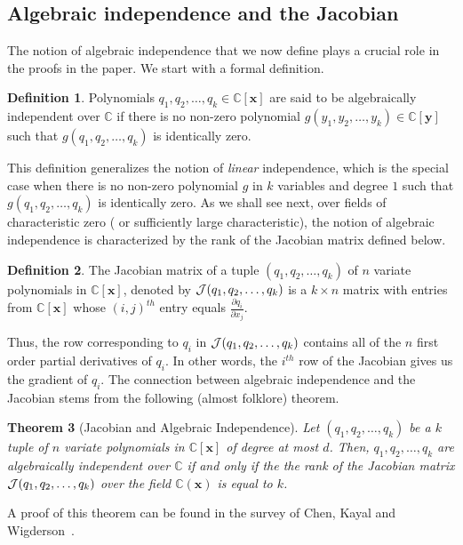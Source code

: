\documentclass[10pt,a4paper]{article}
\newtheorem{theorem}{Theorem}
\theoremstyle{definition}
\newtheorem{definition}[theorem]{Definition}
\newcommand{\F}{\mathbb C}
\newcommand{\vx}{\mathbf x}
\newcommand{\vy}{\mathbf y}
\begin{document}
%
%

%
%

\subsection{Algebraic independence and the Jacobian}
The notion of algebraic independence that we now define plays a crucial role in the proofs in the paper. We start with a formal definition. 
\begin{definition}\label{def:algebraic independence}
Polynomials $q_1, q_2, \ldots, q_k \in  \F[\vx]$ are said to be algebraically independent over $\F$ if there is no non-zero polynomial $g(y_1, y_2, \ldots, y_k) \in \F[\vy]$ such that $g(q_1, q_2, \ldots, q_k)$ is identically zero. 
\end{definition}
This definition generalizes the notion of \emph{linear} independence, which is the special case when there is no non-zero polynomial $g$ in $k$ variables and degree $1$ such that $g(q_1, q_2, \ldots, q_k)$ is identically zero. As we shall see next, over fields of characteristic zero ( or sufficiently large characteristic), the notion of algebraic independence is characterized by the rank of the Jacobian matrix defined below. 
\begin{definition}\label{def:jacobian}
The Jacobian matrix of a tuple $(q_1, q_2, \ldots, q_k)$ of $n$ variate polynomials in $\F[\vx]$, denoted by ${\cal J}(q_1, q_2, \ldots, q_k)$ is a $k \times n$ matrix with entries from $\F[\vx]$ whose $(i, j)^{th}$ entry equals $\frac{\partial q_i}{\partial x_j}$. 
\end{definition}
Thus, the row corresponding to $q_i$ in ${\cal J}(q_1, q_2, \ldots, q_k)$ contains all of the $n$ first order partial derivatives of $q_i$. In other words, the $i^{th}$ row of the Jacobian gives us the gradient of $q_i$. The connection between algebraic independence and the Jacobian stems from the following (almost folklore) theorem. 
\begin{theorem}[Jacobian and Algebraic Independence]\label{thm:jac and alg ind}
Let $\left(q_1, q_2, \ldots, q_k \right)$ be a $k$ tuple of $n$ variate polynomials in $\F[\vx]$ of degree at most $d$. Then, $q_1, q_2, \ldots, q_k$ are algebraically independent over $\F$ if and only if the the rank of the Jacobian matrix ${\cal J}(q_1, q_2, \ldots, q_k)$ over the field $\F(\vx)$ is equal to $k$.
\end{theorem}
A proof of this theorem can be found in the survey of Chen, Kayal and Wigderson~\cite[Chapter 3]{r4}. 
\end{document}
